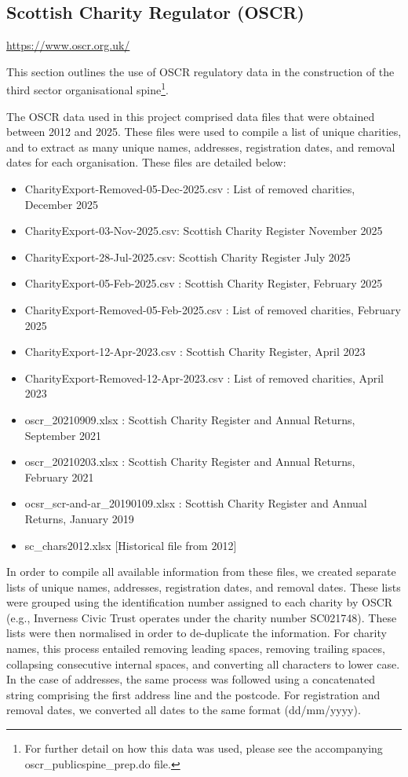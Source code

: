 \documentclass{article}
\begin{document}
\clearpage%
\subsection{Scottish Charity Regulator (OSCR)}
\url{https://www.oscr.org.uk/}

This section outlines the use of OSCR regulatory data in the construction of the third sector
organisational spine\footnote{ For further detail on how this data was used, please see the accompanying
oscr\_publicspine\_prep.do file.}.

The OSCR data used in this project comprised data files that were obtained
between 2012 and 2025. These files were used to compile a list of unique charities, and to
extract   as   many   unique   names,   addresses,   registration   dates,   and   removal   dates   for   each
organisation. These files are detailed below: 
\begin{itemize}
  \item CharityExport-Removed-05-Dec-2025.csv : List of removed charities, December 2025
  \item CharityExport-03-Nov-2025.csv: Scottish Charity Register November 2025
  \item CharityExport-28-Jul-2025.csv: Scottish Charity Register July 2025
  \item CharityExport-05-Feb-2025.csv : Scottish Charity Register, February 2025
  \item CharityExport-Removed-05-Feb-2025.csv : List of removed charities, February 2025
  \item CharityExport-12-Apr-2023.csv : Scottish Charity Register, April 2023
  \item CharityExport-Removed-12-Apr-2023.csv : List of removed charities, April 2023
  \item oscr\_20210909.xlsx : Scottish Charity Register and Annual Returns, September 2021
  \item oscr\_20210203.xlsx : Scottish Charity Register and Annual Returns, February 2021
  \item ocsr\_scr-and-ar\_20190109.xlsx   : Scottish   Charity   Register   and   Annual   Returns,
January 2019
  \item sc\_chars2012.xlsx [Historical file from 2012]
\end{itemize}
In order to compile all available information from these files, we created separate lists of unique
names, addresses, registration dates, and removal dates. These lists were grouped using the
identification number assigned to each charity by OSCR (e.g., Inverness Civic Trust operates
under the charity number SC021748). These lists were then normalised in order to de-duplicate
the information. For charity names, this process entailed removing leading spaces, removing
trailing spaces, collapsing consecutive internal spaces, and converting all characters to lower
case. In the case of addresses, the same process was followed using a concatenated string
comprising the first address line and the postcode. For registration and removal dates, we
converted all dates to the same format (dd/mm/yyyy). 
\end{document}
